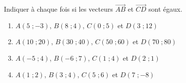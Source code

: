 \begin{exo}{}
	Indiquer à chaque fois si les vecteurs $\vec{AB}$ et $\vec{CD}$ sont égaux.

	\begin{enumerate}[itemsep=1mm]
		\item $A(5\;; -3)$, $B(8\;; 4)$, $C(0\;; 5)$ et $D(3\;; 12)$
		\item $A(10\;; 20)$, $B(30\;; 40)$, $C(50\;; 60)$ et $D(70\;; 80)$
		\item $A(-5\;; 4)$, $B(-6\;; 7)$, $C(1\;; 4)$ et $D(2\;; 1)$
		\item $A(1\;; 2)$, $B(3\;; 4)$, $C(5\;; 6)$ et $D(7\;; -8)$
	\end{enumerate}
\end{exo}
